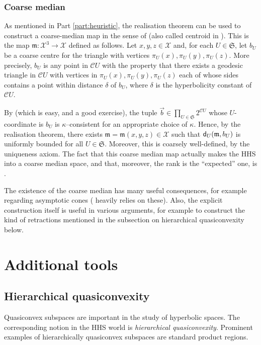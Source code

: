 \documentclass[11pt,oneside]{amsart}
\newcounter{ax}
\theoremstyle{definition}
\newcommand{\tup}[1]{\vec{#1}}
\newcommand{\co}{\colon}
\newcommand{\dist}{\textup{\textsf{d}}}
\newcommand{\cuco}[1]{{\mathcal #1}}
\newcommand{\fontact}{{\mathcal C}}
\newcommand{\median}{\mathfrak m}
\begin{document}
\subsubsection{Coarse median}
As mentioned in Part \ref{part:heuristic}, the realisation theorem can be used to construct a coarse-median map in the sense of \cite{Bow_coarse_median} (also called centroid in \cite{BM_centroid}). This is the map $\median\co\cuco X^3\rightarrow\cuco X$ defined as follows.  Let $x,y,z\in\cuco X$ and, for each $U\in\mathfrak S$, let $b_U$ be a coarse centre for the triangle with vertices $\pi_U(x),\pi_U(y),\pi_U(z)$. More precisely, $b_U$ is any point in $\fontact U$ with the property that there exists
 a geodesic triangle in $\fontact U$ with vertices in
 $\pi_U(x),\pi_U(y),\pi_U(z)$ each of whose sides contains a point
 within distance $\delta$ of $b_U$, where $\delta$ is the hyperbolicity constant of $\fontact U$.

By \cite[Lemma 2.6]{HHS2} (which is easy, and a good exercise), the tuple $\tup b\in\prod_{U\in\mathfrak S}2^{\fontact U}$ whose $U$-coordinate is $b_U$ is $\kappa$--consistent for an appropriate choice of $\kappa$.  Hence, by the realisation theorem, there exists $\median=\median(x,y,z)\in\cuco X$ such that $\dist_U(\median,b_U)$ is uniformly bounded for all $U\in\mathfrak S$.  Moreover, this is coarsely well-defined, by the uniqueness axiom. The fact that this coarse median map actually makes the HHS into a coarse median space, and that, moreover, the rank is the ``expected'' one, is \cite[Corollary 2.15]{HHS_quasiflats}. 

The existence of the coarse median has many useful consequences, for example regarding asymptotic cones \cite{Bow_coarse_median,Bowditch:rigid} (\cite{HHS_quasiflats} heavily relies on these). Also, the explicit construction itself is useful in various arguments, for example to construct the kind of retractions mentioned in the subsection on hierarchical quasiconvexity below.



\section{Additional tools}

\subsection{Hierarchical quasiconvexity}

Quasiconvex subspaces are important in the study of hyperbolic spaces. The corresponding notion in the HHS world is \emph{hierarchical quasiconvexity}. Prominent examples of hierarchically quasiconvex subspaces are standard product regions.
\end{document}
